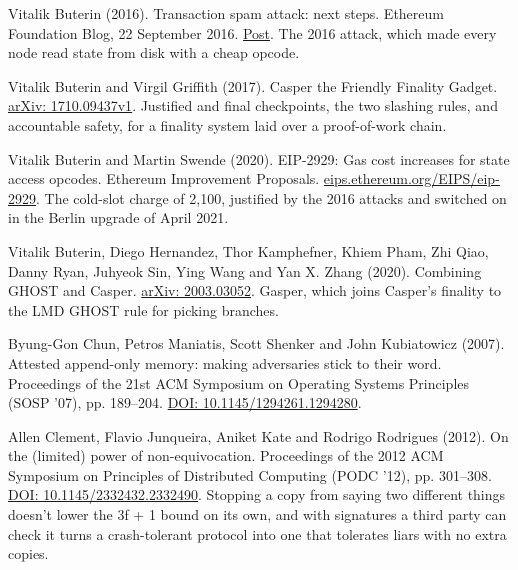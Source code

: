 \documentclass[11pt,twoside]{article}
\theoremstyle{thielethm}
\theoremstyle{thieledef}
\theoremstyle{thieledef}
\theoremstyle{thieledef}
\theoremstyle{thielethm}
\theoremstyle{thieleobs}
\theoremstyle{thielethm}
\begin{document}
\noindent Vitalik Buterin (2016). Transaction spam attack: next steps. Ethereum Foundation Blog, 22 September 2016. \href{https://blog.ethereum.org/2016/09/22/transaction-spam-attack-next-steps/}{Post}. The 2016 attack, which made every node read state from disk with a cheap opcode.
\par\medskip

\noindent Vitalik Buterin and Virgil Griffith (2017). Casper the Friendly Finality Gadget. \href{https://arxiv.org/abs/1710.09437v1}{arXiv: 1710.09437v1}. Justified and final checkpoints, the two slashing rules, and accountable safety, for a finality system laid over a proof-of-work chain.
\par\medskip

\noindent Vitalik Buterin and Martin Swende (2020). EIP-2929: Gas cost increases for state access opcodes. Ethereum Improvement Proposals. \href{https://eips.ethereum.org/EIPS/eip-2929}{eips.ethereum.org/EIPS/eip-2929}. The cold-slot charge of 2,100, justified by the 2016 attacks and switched on in the Berlin upgrade of April 2021.
\par\medskip

\noindent Vitalik Buterin, Diego Hernandez, Thor Kamphefner, Khiem Pham, Zhi Qiao, Danny Ryan, Juhyeok Sin, Ying Wang and Yan X. Zhang (2020). Combining GHOST and Casper. \href{https://arxiv.org/abs/2003.03052}{arXiv: 2003.03052}. Gasper, which joins Casper's finality to the LMD GHOST rule for picking branches.
\par\medskip

\noindent Byung-Gon Chun, Petros Maniatis, Scott Shenker and John Kubiatowicz (2007). Attested append-only memory: making adversaries stick to their word. Proceedings of the 21st ACM Symposium on Operating Systems Principles (SOSP '07), pp. 189--204. \href{https://doi.org/10.1145/1294261.1294280}{DOI: 10.1145/1294261.1294280}.
\par\medskip

\noindent Allen Clement, Flavio Junqueira, Aniket Kate and Rodrigo Rodrigues (2012). On the (limited) power of non-equivocation. Proceedings of the 2012 ACM Symposium on Principles of Distributed Computing (PODC '12), pp. 301--308. \href{https://doi.org/10.1145/2332432.2332490}{DOI: 10.1145/2332432.2332490}. Stopping a copy from saying two different things doesn't lower the 3f + 1 bound on its own, and with signatures a third party can check it turns a crash-tolerant protocol into one that tolerates liars with no extra copies.
\par\medskip
\end{document}
